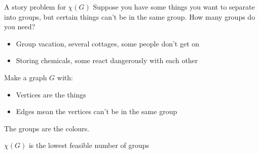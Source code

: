 \documentclass{beamer}
\begin{document}
\begin{frame}{A story problem for $\chi(G)$}
  Suppose you have some things you want to separate into groups, but certain things can't be in the same group.  How many groups do you need?
  \begin{itemize}
  \item Group vacation, several cottages, some people don't get on
  \item Storing chemicals, some react dangerously with each other
    \end{itemize}
\begin{block}{Make a graph $G$ with:}
  \begin{itemize}
  \item Vertices are the things
  \item Edges mean the vertices can't be in the same group
  \end{itemize}
  The groups are the colours.
\end{block}
\begin{block}{$\chi(G)$ is the lowest feasible number of groups}
  \end{block}
  


  \end{frame}
\end{document}

